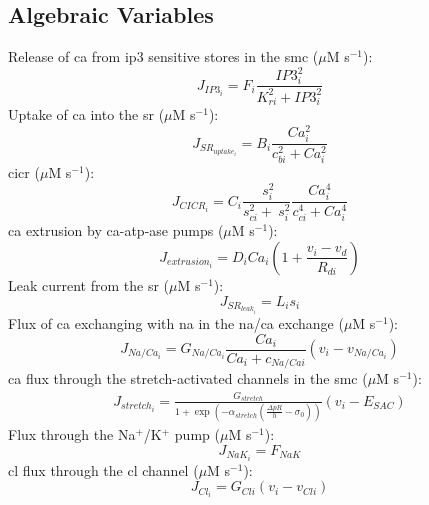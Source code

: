 \documentclass[11pt]{elsarticle}
\newcommand{\sodpot}{Na$^+$/K$^+$\xspace}
\newcommand{\mus}{$\mu$M s$^{-1}$\xspace}
\newcommand{\na}{\gls{na}\xspace}
\newcommand{\cl}{\gls{cl}\xspace}
\newcommand{\ca}{\gls{ca}\xspace}
\newcommand{\ip}{\gls{ip3}\xspace}
\begin{document}
		\subsection{Algebraic Variables}	
%
Release of \ca from \ip sensitive stores in the \gls{smc} (\mus):
\begin{equation} \label{eq:IP3i}
J_{IP3_i} = F_{i}\frac{IP3_i^{2}}{K_{ri}^{2}+IP3_{i}^{2}}
\end{equation}
%
Uptake of \ca into the \gls{sr} (\mus):
\begin{equation} \label{eq:JSRuptakei}
J_{SR_{uptake_{i}}} = B_{i}\frac{Ca_i^{2}}{c_{bi}^{2}+Ca_i^{2}}
\end{equation}
%
\Gls{cicr} (\mus):
\begin{equation} \label{eq:JCICRi}
J_{CICR_{i}} = C_{i}\frac{\ s_i^{2}}{s_{ci}^{2}+\ s_i^{2}}    \frac{Ca_i^{4}}{c_{ci}^{4}+Ca_i^{4}}
\end{equation}
%
\ca extrusion by \ca-\gls{atp}-ase pumps (\mus):
\begin{equation} \label{eq:Jextrusioni}
J_{extrusion_{i}} = D_{i}Ca_i   \left( 1+ \frac{v_{i}-v_{d}}{R_{di}}\right)
\end{equation}
%
Leak current from the \gls{sr} (\mus):
\begin{equation} \label{eq:JSRleaki}
J_{SR_{leak_{i}}} = L_{i} s_i
\end{equation}
%
Flux of \ca exchanging with \na in the \na/\ca exchange (\mus): 
\begin{equation} \label{eq:JNaCai}
J_{Na/Ca_{i}} = G_{Na/Ca_{i}} \frac{Ca_i}     {Ca_i + c_{Na/Cai}} \left( v_{i}-v_{Na/Ca_{i}} \right)
\end{equation}
%
\ca flux through the stretch-activated channels in the \gls{smc} (\mus): 
\begin{equation} \label{eq:Jstretchi}
\begin{split}
J_{stretch_{i}}= \frac{G_{stretch}}{1+ \exp\left(-\alpha_{stretch}  \left(  \frac{\Delta pR}{h} -\sigma_{0}   \right) \right)}  \left(  v_{i}-E_{SAC}   \right) 
\end{split}
\end{equation}
%
Flux through the \sodpot pump (\mus): 
\begin{equation} \label{eq:J_NaK_i}
J_{NaK_{i}}= F_{NaK}
\end{equation}
%
\cl flux through the \cl channel (\mus):
\begin{equation} \label{eq:JCli}
J_{Cl_{i}} = G_{Cli} \left(  v_{i} - v_{Cli}  \right) 
\end{equation}
%
\end{document}

